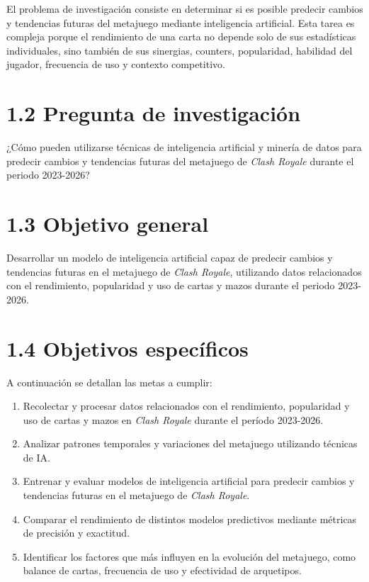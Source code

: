 \documentclass[
  spanish,
  12pt,
]{report}
\providecommand{\tightlist}{%
  \setlength{\itemsep}{0pt}\setlength{\parskip}{0pt}}
\begin{document}
El problema de investigación consiste en determinar si es posible
predecir cambios y tendencias futuras del metajuego mediante
inteligencia artificial. Esta tarea es compleja porque el rendimiento de
una carta no depende solo de sus estadísticas individuales, sino también
de sus sinergias, counters, popularidad, habilidad del jugador,
frecuencia de uso y contexto competitivo.

\section{1.2 Pregunta de
investigación}\label{pregunta-de-investigaciuxf3n}

¿Cómo pueden utilizarse técnicas de inteligencia artificial y minería de
datos para predecir cambios y tendencias futuras del metajuego de
\emph{Clash Royale} durante el periodo 2023-2026?

\section{1.3 Objetivo general}\label{objetivo-general}

Desarrollar un modelo de inteligencia artificial capaz de predecir
cambios y tendencias futuras en el metajuego de \emph{Clash Royale},
utilizando datos relacionados con el rendimiento, popularidad y uso de
cartas y mazos durante el periodo 2023-2026.

\section{1.4 Objetivos específicos}\label{objetivos-especuxedficos}

A continuación se detallan las metas a cumplir:

\begin{enumerate}
\def\labelenumi{\arabic{enumi}.}
\tightlist
\item
  Recolectar y procesar datos relacionados con el rendimiento,
  popularidad y uso de cartas y mazos en \emph{Clash Royale} durante el
  período 2023-2026.
\item
  Analizar patrones temporales y variaciones del metajuego utilizando
  técnicas de IA.
\item
  Entrenar y evaluar modelos de inteligencia artificial para predecir
  cambios y tendencias futuras en el metajuego de \emph{Clash Royale}.
\item
  Comparar el rendimiento de distintos modelos predictivos mediante
  métricas de precisión y exactitud.
\item
  Identificar los factores que más influyen en la evolución del
  metajuego, como balance de cartas, frecuencia de uso y efectividad de
  arquetipos.
\end{enumerate}
\end{document}
